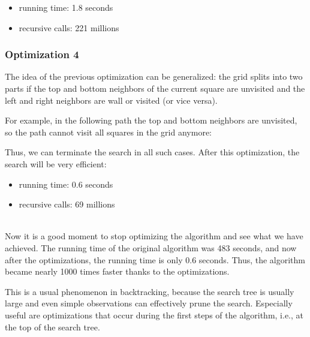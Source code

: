 \begin{itemize}
\item
running time: 1.8 seconds
\item
recursive calls: 221 millions
\end{itemize}

\subsubsection{Optimization 4}

The idea of the previous optimization
can be generalized:
the grid splits into two parts
if the top and bottom neighbors
of the current square are unvisited and
the left and right neighbors are
wall or visited (or vice versa).

For example, in the following path
the top and bottom neighbors are unvisited,
so the path cannot visit all squares
in the grid anymore:
\begin{center}
\end{center}
Thus, we can terminate the search in all such cases.
After this optimization, the search will be
very efficient:

\begin{itemize}
\item
running time: 0.6 seconds
\item
recursive calls: 69 millions
\end{itemize}

~\\
Now it is a good moment to stop optimizing
the algorithm and see what we have achieved.
The running time of the original algorithm
was 483 seconds,
and now after the optimizations,
the running time is only 0.6 seconds.
Thus, the algorithm became nearly 1000 times
faster thanks to the optimizations.

This is a usual phenomenon in backtracking,
because the search tree is usually large
and even simple observations can effectively
prune the search.
Especially useful are optimizations that
occur during the first steps of the algorithm,
i.e., at the top of the search tree.

